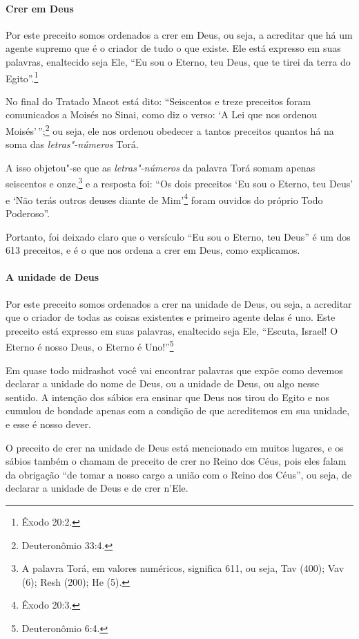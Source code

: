 \begin{multicols}{2}
\paragraph{Crer em Deus}

Por este preceito somos ordenados a crer em Deus, ou seja, a acreditar
que há um agente supremo que é o criador de tudo o que existe. Ele está
expresso em suas palavras, enaltecido seja Ele, ``Eu sou o Eterno, teu
Deus, que te tirei da terra do Egito''.\footnote{Êxodo 20:2.}

No final do Tratado Macot\starr{} está dito: ``Seiscentos e treze preceitos
foram comunicados a Moisés no Sinai, como diz o verso: `A Lei que nos
ordenou Moisés'\,'';\footnote{Deuteronômio 33:4.} ou seja, ele nos ordenou obedecer a tantos preceitos quantos há na soma das \emph{letras"-números} Torá\starr. 

A isso objetou"-se que as \emph{letras"-números} da palavra Torá\starr{} somam apenas seiscentos e onze,\footnote{A palavra Torá\starr, em valores numéricos, significa 611, ou seja, Tav (400); Vav (6); Resh (200); He (5).} e a resposta foi: ``Os dois preceitos `Eu sou o Eterno, teu Deus' e `Não terás outros
deuses diante de Mim'\footnote{Êxodo 20:3.} foram ouvidos do próprio Todo
Poderoso''.

Portanto, foi deixado claro que o versículo ``Eu sou o Eterno, teu
Deus'' é um dos 613 preceitos, e é o que nos ordena a crer em Deus, como
explicamos.

\paragraph{A unidade de Deus}

Por este preceito somos ordenados a crer na unidade de Deus, ou seja, a
acreditar que o criador de todas as coisas existentes e primeiro agente
delas é uno. Este preceito está expresso em suas palavras, enaltecido
seja Ele, ``Escuta, Israel! O Eterno é nosso Deus, o Eterno é Uno!''\footnote{Deuteronômio 6:4.}

Em quase todo midrashot\starr{} você vai encontrar palavras que
expõe como devemos declarar a unidade do nome de Deus, ou a unidade
de Deus, ou algo nesse sentido. A intenção dos sábios era ensinar que
Deus nos tirou do Egito e nos cumulou de bondade apenas com a condição
de que acreditemos em sua unidade, e esse é nosso dever.

O preceito de crer na unidade de Deus está mencionado em muitos lugares,
e os sábios também o chamam de preceito de crer no Reino dos Céus,
pois eles falam da obrigação ``de tomar a nosso cargo a união com o
Reino dos Céus'', ou seja, de declarar a unidade de Deus e de crer
n'Ele.


\end{multicols}
